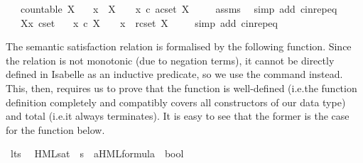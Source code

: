 \begin{isabellebody}
\ \ \ {\isacartoucheopen}countable\ X{\isacartoucheclose}\isanewline
\ \ \ {\isacartoucheopen}x\ {\isasymin}\ X\ \ {\isasymLongleftrightarrow}\ \ x\ {\isasymin}\isactrlsub c\ acset\ X{\isacartoucheclose}\ \isanewline
%
\isadelimproof
\ \ %
\endisadelimproof
%
\isatagproof
{}\isamarkupfalse%
\ assms\ \isamarkupfalse%
\ {\isacharparenleft}{\kern0pt}simp\ add{\isacharcolon}{\kern0pt}\ cin{\isachardot}{\kern0pt}rep{\isacharunderscore}{\kern0pt}eq{\isacharparenright}{\kern0pt}%
\endisatagproof
{\isafoldproof}%
%
\isadelimproof
\isanewline
%
\endisadelimproof
{}\isamarkupfalse%
\isanewline
\ \ \ X{\isacharcolon}{\kern0pt}{\isacharcolon}{\kern0pt}{\isacartoucheopen}{\isacharprime}{\kern0pt}x\ cset{\isacartoucheclose}\isanewline
\ \ \ {\isacartoucheopen}x\ {\isasymin}\isactrlsub c\ X\ \ {\isasymLongleftrightarrow}\ \ x\ {\isasymin}\ rcset\ X{\isacartoucheclose}\ \isanewline
%
\isadelimproof
\ \ %
\endisadelimproof
%
\isatagproof
{}\isamarkupfalse%
\ {\isacharparenleft}{\kern0pt}simp\ add{\isacharcolon}{\kern0pt}\ cin{\isachardot}{\kern0pt}rep{\isacharunderscore}{\kern0pt}eq{\isacharparenright}{\kern0pt}%
\endisatagproof
{\isafoldproof}%
%
\isadelimproof
%
\endisadelimproof
%
\isadelimdocument
%
\endisadelimdocument
%
\isatagdocument
%
\isamarkuptrue%
%
\endisatagdocument
{\isafolddocument}%
%
\isadelimdocument
%
\endisadelimdocument
%
\begin{isamarkuptext}%
The semantic satisfaction relation is formalised by the following function. Since the relation is not monotonic (due to negation terms), it cannot be directly defined in Isabelle as an inductive predicate, so we use the  command instead. This, then, requires us to prove that the function is well-defined (i.e.\@ the function definition completely and compatibly covers all constructors of our data type) and total (i.e.\@ it always terminates). It is easy to see that the former is the case for the function below.
\pagebreak%
\end{isamarkuptext}\isamarkuptrue%
\isamarkupfalse%
\ lts\ \isanewline
\isanewline
{}\isamarkupfalse%
\ HML{\isacharunderscore}{\kern0pt}sat\ {\isacharcolon}{\kern0pt}{\isacharcolon}{\kern0pt}\ {\isacartoucheopen}{\isacharprime}{\kern0pt}s\ {\isasymRightarrow}\ {\isacharparenleft}{\kern0pt}{\isacharprime}{\kern0pt}a{\isacharparenright}{\kern0pt}HML{\isacharunderscore}{\kern0pt}formula\ {\isasymRightarrow}\ bool{\isacartoucheclose}\isanewline

\end{isabellebody}
